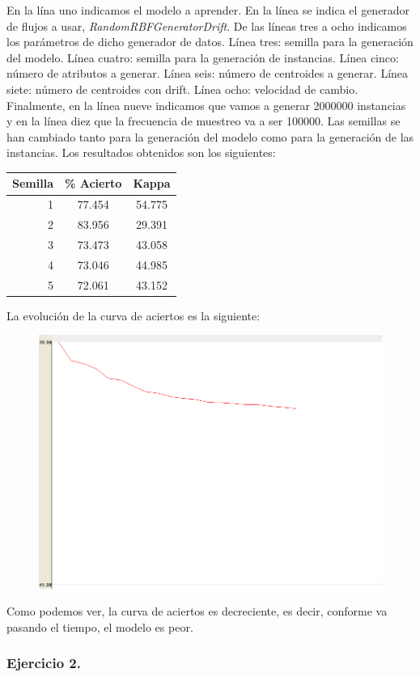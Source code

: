 \documentclass[11pt]{article}
\begin{document}
En la lína uno indicamos el modelo a aprender. En la línea se indica el generador de flujos a usar, \textit{RandomRBFGeneratorDrift}. De las líneas tres a ocho indicamos los parámetros de dicho generador de datos. Línea tres: semilla para la generación del modelo. Línea cuatro: semilla para la generación de instancias. Línea cinco: número de atributos a generar. Línea seis: número de centroides a generar. Línea siete: número de centroides con drift. Línea ocho: velocidad de cambio. Finalmente, en la línea nueve indicamos que vamos a generar 2000000 instancias y en la línea diez que la frecuencia de muestreo va a ser 100000. Las semillas se han cambiado tanto para la generación del modelo como para la generación de las instancias. Los resultados obtenidos son los siguientes:

\begin{table}[H]
	\centering
	\begin{tabular}{rcc}
		\textbf{Semilla} & \textbf{\% Acierto} & \textbf{Kappa} \\ \hline
		1 & 77.454 & 54.775 \\
		2 & 83.956 & 29.391 \\
		3 & 73.473 & 43.058 \\
		4 & 73.046 & 44.985 \\
		5 & 72.061 & 43.152
	\end{tabular}
\end{table}

La evolución de la curva de aciertos es la siguiente:

\begin{figure}[H]
	\centering
	\includegraphics[width=0.5\linewidth]{2_3_1.png}
\end{figure}

Como podemos ver, la curva de aciertos es decreciente, es decir, conforme va pasando el tiempo, el modelo es peor.

\subsubsection{Ejercicio 2.}
\end{document}
